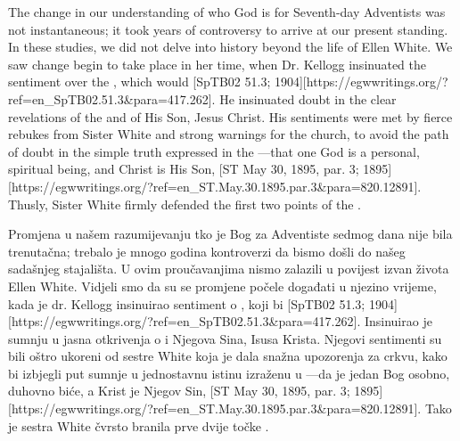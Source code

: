 The change in our understanding of who God is for Seventh-day Adventists was not instantaneous; it took years of controversy to arrive at our present standing. In these studies, we did not delve into history beyond the life of Ellen White. We saw change begin to take place in her time, when Dr. Kellogg insinuated the sentiment over the , which would [SpTB02 51.3; 1904][https://egwwritings.org/?ref=en\_SpTB02.51.3&para=417.262]. He insinuated doubt in the clear revelations of the  and of His Son, Jesus Christ. His sentiments were met by fierce rebukes from Sister White and strong warnings for the church, to avoid the path of doubt in the simple truth expressed in the —that one God is a personal, spiritual being, and Christ is His Son, [ST May 30, 1895, par. 3; 1895][https://egwwritings.org/?ref=en\_ST.May.30.1895.par.3&para=820.12891]. Thusly, Sister White firmly defended the first two points of the .


Promjena u našem razumijevanju tko je Bog za Adventiste sedmog dana nije bila trenutačna; trebalo je mnogo godina kontroverzi da bismo došli do našeg sadašnjeg stajališta. U ovim proučavanjima nismo zalazili u povijest izvan života Ellen White. Vidjeli smo da su se promjene počele događati u njezino vrijeme, kada je dr. Kellogg insinuirao sentiment o , koji bi [SpTB02 51.3; 1904][https://egwwritings.org/?ref=en\_SpTB02.51.3&para=417.262]. Insinuirao je sumnju u jasna otkrivenja o  i Njegova Sina, Isusa Krista. Njegovi sentimenti su bili oštro ukoreni od sestre White koja je dala snažna upozorenja za crkvu, kako bi izbjegli put sumnje u jednostavnu istinu izraženu u —da je jedan Bog osobno, duhovno biće, a Krist je Njegov Sin, [ST May 30, 1895, par. 3; 1895][https://egwwritings.org/?ref=en\_ST.May.30.1895.par.3&para=820.12891]. Tako je sestra White čvrsto branila prve dvije točke .


